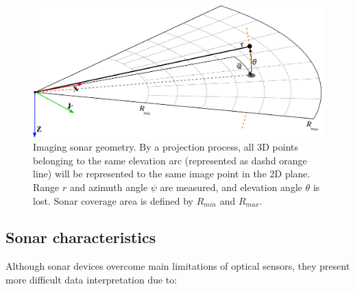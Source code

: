 \documentclass[final,5p,times]{elsarticle}
\begin{document}
\begin{figure}[t]
    \includegraphics[width=\columnwidth]{figs/sonar_geometry_2}
    \captionsetup{justification=justified}
    \caption{Imaging sonar geometry. By a projection process, all 3D points  belonging to the same elevation arc (represented as dashd orange line) will be represented to the same image point in the 2D plane. Range $r$ and azimuth angle $\psi$ are measured, and elevation angle $\theta$ is lost. Sonar coverage area is defined by $R_{min}$ and $R_{max}$.}
    \label{fig:sonar_geometry}
\end{figure}


\subsection{Sonar characteristics}
\label{sonar:characteristics}

Although sonar devices overcome main limitations of optical sensors, they
present more difficult data interpretation due to:
\end{document}
